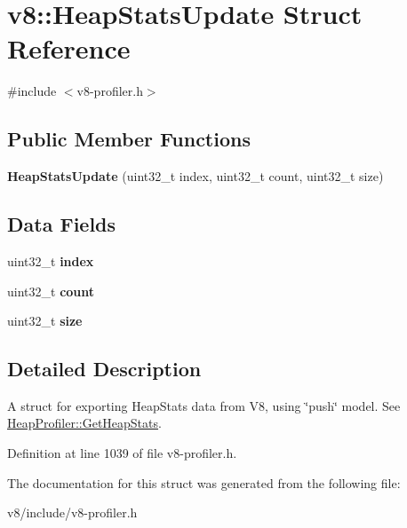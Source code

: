 \hypertarget{structv8_1_1HeapStatsUpdate}{}\section{v8\+:\+:Heap\+Stats\+Update Struct Reference}
\label{structv8_1_1HeapStatsUpdate}


{\ttfamily \#include $<$v8-\/profiler.\+h$>$}

\subsection*{Public Member Functions}
\begin{DoxyCompactItemize}
\item 
\mbox{\label{structv8_1_1HeapStatsUpdate_aba606181fa7071647cc91a558c450cf3}} 
{\bfseries Heap\+Stats\+Update} (uint32\+\_\+t index, uint32\+\_\+t count, uint32\+\_\+t size)
\end{DoxyCompactItemize}
\subsection*{Data Fields}
\begin{DoxyCompactItemize}
\item 
\mbox{\label{structv8_1_1HeapStatsUpdate_a90f427acc6e9b8cf2001ca09541545d7}} 
uint32\+\_\+t {\bfseries index}
\item 
\mbox{\label{structv8_1_1HeapStatsUpdate_aa74badb1bd196e538b45b971350c33de}} 
uint32\+\_\+t {\bfseries count}
\item 
\mbox{\label{structv8_1_1HeapStatsUpdate_a842a199bd372f411f0ae5816e38c45e2}} 
uint32\+\_\+t {\bfseries size}
\end{DoxyCompactItemize}


\subsection{Detailed Description}
A struct for exporting Heap\+Stats data from V8, using \char`\"{}push\char`\"{} model. See \mbox{\hyperlink{classv8_1_1HeapProfiler_add093717acd067daeddb7ef5fc8b191a}{Heap\+Profiler\+::\+Get\+Heap\+Stats}}. 

Definition at line 1039 of file v8-\/profiler.\+h.



The documentation for this struct was generated from the following file\+:\begin{DoxyCompactItemize}
\item 
v8/include/v8-\/profiler.\+h\end{DoxyCompactItemize}
